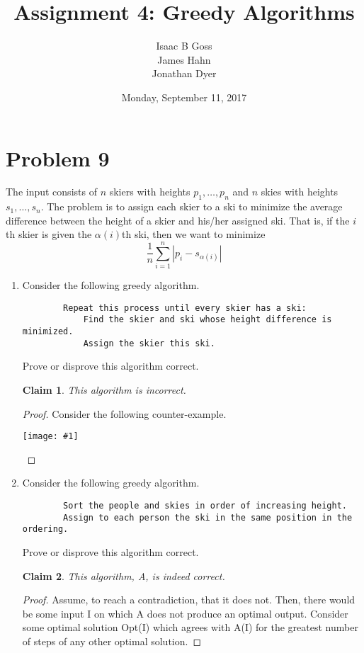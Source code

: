 \documentclass{article}
\author{Isaac B Goss\\ James Hahn\\ Jonathan Dyer}
\title{Assignment 4: Greedy Algorithms}
\date{Monday, September 11, 2017}
\newtheorem{thm}{Claim}
\providecommand{\prob}[1]{\section*{Problem #1}}
\providecommand{\image}[1]{
    \begin{center}
        \texttt{[image: \#1]}
    \end{center}
}
\begin{document}
\maketitle

    \prob{9}
    The input consists of $n$ skiers with heights $p_1,\dots,p_n$ and $n$ skies with heights $s_1,\dots,s_n$.
    The problem is to assign each skier to a ski to minimize the average difference between the height of a skier and his/her assigned ski.
    That is, if the $i$th skier is given the $\alpha(i)$th ski, then we want to minimize
    $$ \frac{1}{n} \sum_{i=1}^n |p_i - s_{\alpha(i)} | $$
    
    \begin{enumerate}[label=(\alph*)]
        \item Consider the following greedy algorithm.
        \begin{lstlisting}
        Repeat this process until every skier has a ski:
            Find the skier and ski whose height difference is minimized.
            Assign the skier this ski.
        \end{lstlisting}
        Prove or disprove this algorithm correct.
        
        \begin{thm}
            This algorithm is incorrect.
        \end{thm}
        \begin{proof}
            Consider the following counter-example.
            \image{p9table}
        \end{proof}
        
        \item Consider the following greedy algorithm.
        \begin{lstlisting}
        Sort the people and skies in order of increasing height.
        Assign to each person the ski in the same position in the ordering.
        \end{lstlisting}
        Prove or disprove this algorithm correct.
        
        \begin{thm}
            This algorithm, A, is indeed correct.
        \end{thm}
        \begin{proof}
            Assume, to reach a contradiction, that it does not.
            Then, there would be some input I on which A does not produce an optimal output.
            Consider some optimal solution Opt(I) which agrees with A(I) for the greatest number of steps of any other optimal solution.
            

\end{proof}
\end{enumerate}
\end{document}
